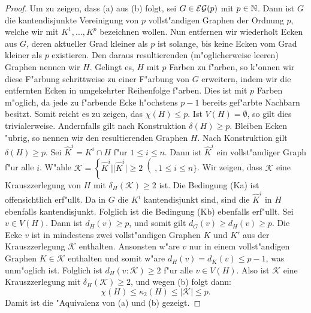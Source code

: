 \begin{proof}
  Um zu zeigen, dass (a) aus (b) folgt, sei $G\in {\cal EG}(p) $ mit $p\in {\mathbb{N}}$. Dann ist $G$ die kantendisjunkte Vereinigung von $p$ vollst"andigen Graphen der Ordnung $p$, welche wir mit $K^{1},\dots, K^{p}$ bezeichnen wollen. Nun entfernen wir wiederholt Ecken aus $G$,  deren aktueller Grad kleiner als $p$ ist solange, bis keine Ecken vom Grad kleiner als $p$ existieren. Den daraus resultierenden (m"oglicherweise leeren) Graphen nennen wir $H$. 
  Gelingt es, $H$ mit $p$ Farben zu f"arben, so k"onnen wir diese F"arbung schrittweise zu einer F"arbung von $G$ erweitern, indem wir die entfernten Ecken in umgekehrter Reihenfolge f"arben. Dies ist mit $p$ Farben m"oglich, da jede zu f"arbende Ecke h"ochstens $p-1$ bereits gef"arbte Nachbarn besitzt.
  Somit reicht es zu zeigen, das $\chi(H) \leq p$. Ist $V(H) =\emptyset$, so gilt dies trivialerweise. Andernfalls gilt nach Konstruktion $\delta(H) \geq p $. 
  Bleiben Ecken "ubrig, so nennen wir den resultierenden Graphen $H$. Nach Konstruktion gilt $\delta(H) \geq p$. Sei $\hat{K}^i = K^{i} \cap H$ f"ur $1\leq i \leq n$. Dann ist $\hat{K}^i$ ein vollst"andiger Graph f"ur alle $i$. W"ahle $\mathcal{K} = \left\{ \hat{K}^i | | \hat{K}^i| \geq 2  \right( , 1\leq i \leq n\}$. Wir zeigen, dass $\mathcal{K}$ eine Krauszzerlegung von $H$ mit $\delta_{H}(\mathcal{K}) \geq 2$ ist.
  Die Bedingung (Ka) ist offensichtlich erf"ullt. Da in $G$ die $K^{i}$ kantendisjunkt sind, sind die $\hat{K}^{i}$ in $H$ ebenfalls kantendisjunkt. Folglich ist die Bedingung (Kb) ebenfalls erf"ullt. Sei $v\in V(H)$. Dann ist $d_{H}(v) \geq p$, und somit gilt $d_{G}(v) \geq d_H(v) \geq p$. 
  Die Ecke $v$ ist in mindestens zwei vollst"andigen Graphen $K$ und $K'$ aus der Krauszzerlegung $\mathcal{K}$ enthalten. 
  Ansonsten w"are $v$ nur in einem vollst"andigen Graphen $K \in \mathcal{K}$ enthalten und somit w"are $d_{H}(v) = d_{K}(v) \leq p-1$, was unm"oglich ist. 
  Folglich ist $d_{H}(v:\mathcal{K}) \geq 2$ f"ur alle $v \in V(H)$. Also ist $\mathcal{K}$ eine Krauszzerlegung mit $\delta_{H}(\mathcal{K}) \geq 2$, und wegen (b) folgt dann:
  \begin{equation*}
    \chi(H) \leq \kappa_{2}(H) \leq |\mathcal{K}| \leq p .
  \end{equation*}
  Damit ist die "Aquivalenz von (a) und (b) gezeigt. 
  

\end{proof}
